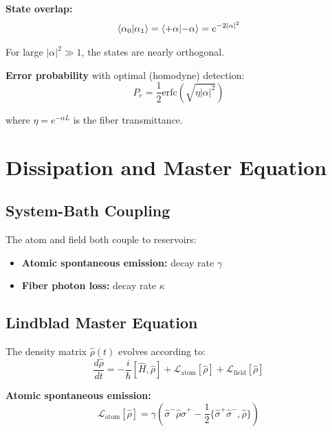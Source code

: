 \documentclass[12pt,a4paper]{article}
\begin{document}
\textbf{State overlap:}
\begin{equation}
\braket{\alpha_0}{\alpha_1} = \braket{+\alpha}{-\alpha} = e^{-2|\alpha|^2} \label{eq:BPSK_overlap}
\end{equation}

For large $|\alpha|^2 \gg 1$, the states are nearly orthogonal.

\textbf{Error probability} with optimal (homodyne) detection:
\begin{equation}
P_e = \frac{1}{2}\text{erfc}\left(\sqrt{\eta|\alpha|^2}\right) \label{eq:BPSK_error}
\end{equation}

where $\eta = e^{-\alpha L}$ is the fiber transmittance.

\section{Dissipation and Master Equation}

\subsection{System-Bath Coupling}

The atom and field both couple to reservoirs:
\begin{itemize}[leftmargin=*]
\item \textbf{Atomic spontaneous emission:} decay rate $\gamma$
\item \textbf{Fiber photon loss:} decay rate $\kappa$
\end{itemize}

\subsection{Lindblad Master Equation}

The density matrix $\hat{\rho}(t)$ evolves according to:
\begin{equation}
\frac{d\hat{\rho}}{dt} = -\frac{i}{\hbar}[\hat{H}, \hat{\rho}] + \mathcal{L}_{\text{atom}}[\hat{\rho}] + \mathcal{L}_{\text{field}}[\hat{\rho}] \label{eq:master_equation}
\end{equation}

\textbf{Atomic spontaneous emission:}
\begin{equation}
\mathcal{L}_{\text{atom}}[\hat{\rho}] = \gamma\left(\hat{\sigma}^- \hat{\rho} \hat{\sigma}^+ - \frac{1}{2}\{\hat{\sigma}^+ \hat{\sigma}^-, \hat{\rho}\}\right) \label{eq:Lindblad_atom}
\end{equation}
\end{document}
